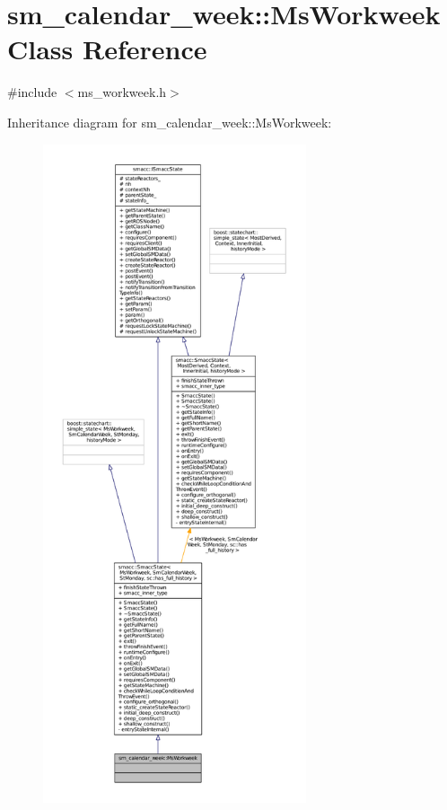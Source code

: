 \hypertarget{classsm__calendar__week_1_1MsWorkweek}{}\section{sm\+\_\+calendar\+\_\+week\+:\+:Ms\+Workweek Class Reference}
\label{classsm__calendar__week_1_1MsWorkweek}


{\ttfamily \#include $<$ms\+\_\+workweek.\+h$>$}



Inheritance diagram for sm\+\_\+calendar\+\_\+week\+:\+:Ms\+Workweek\+:
\nopagebreak
\begin{figure}[H]
\begin{center}
\leavevmode
\includegraphics[height=550pt]{classsm__calendar__week_1_1MsWorkweek__inherit__graph}
\end{center}
\end{figure}


